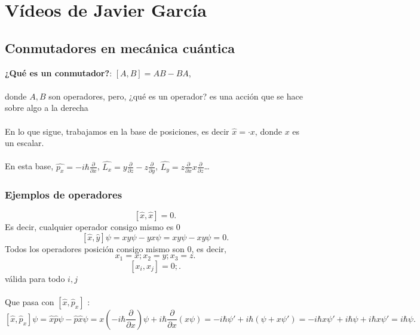 \chapter{Vídeos de Javier García}
\section{Conmutadores en mecánica cuántica}
\textbf{¿Qué es un conmutador?}: $[A,B]=AB-BA$, \\
\\
donde $A,B$ son operadores, pero, ¿qué es un operador? es una acción que se hace sobre algo a la derecha \\
\\
En lo que sigue, trabajamos en la base de posiciones, es decir $\hat{x}= \cdot x$, donde $x$ es un escalar.\\
\\
En esta base, $\hat{p_x} = -i\hbar \frac{\partial  }{\partial x} $, $\hat{L_x}= y \frac{\partial  }{\partial z} -z \frac{\partial  }{\partial y} $, $\hat{L_y}=z \frac{\partial  }{\partial x} 
 x \frac{\partial  }{\partial z} $\ldots

 \subsection{Ejemplos de operadores}
 \[
     [\hat{x},\hat{x}]= 0
 .\] 
 Es decir, cualquier operador consigo mismo es 0
 \[
     [\hat{x},\hat{y}]\psi= xy\psi - yx \psi= xy\psi-xy\psi=0
 .\] 
 Todos los operadores posición consigo mismo son 0, es decir, 
 \[
 x_1=x; x_2=y; x_3=z
 .\] 
 \[
     [x_i,x_j]=0 ; 
 .\] 
 válida para todo $i,j$ \\
 \\
 Que pasa con $[\hat{x},\hat{p}_x]$ :
 \[
     [\hat{x},\hat{p}_x]\psi= \hat{x}\hat{p}\psi - \hat{p}\hat{x}\psi= x\left( -i\hbar \frac{\partial  }{\partial x}  \right) \psi + i\hbar \frac{\partial  }{\partial x} \left( x \psi \right) = -i\hbar \psi' + i\hbar \left( \psi + x\psi' \right) = -i\hbar x\psi'+i\hbar \psi +i\hbar x \psi'= i\hbar \psi
 .\] 
 

 


